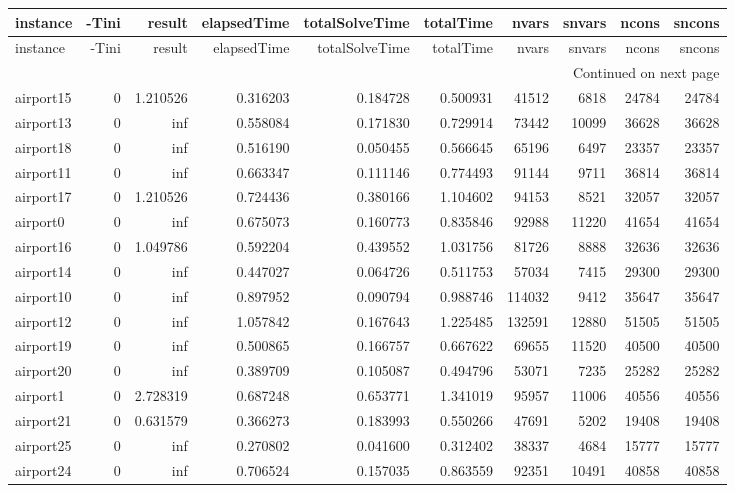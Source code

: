 
\begin{longtable}{|l|r|r|r|r|r|r|r|r|r|}
\toprule
instance & -Tini & result & elapsedTime & totalSolveTime & totalTime & nvars & snvars & ncons & sncons \\
\midrule
\endfirsthead
\toprule
instance & -Tini & result & elapsedTime & totalSolveTime & totalTime & nvars & snvars & ncons & sncons \\
\midrule
\endhead
\midrule
\multicolumn{10}{r}{Continued on next page} \\
\midrule
\endfoot
\bottomrule
\endlastfoot
airport15 & 0 & 1.210526 & 0.316203 & 0.184728 & 0.500931 & 41512 & 6818 & 24784 & 24784 \\
airport13 & 0 & inf & 0.558084 & 0.171830 & 0.729914 & 73442 & 10099 & 36628 & 36628 \\
airport18 & 0 & inf & 0.516190 & 0.050455 & 0.566645 & 65196 & 6497 & 23357 & 23357 \\
airport11 & 0 & inf & 0.663347 & 0.111146 & 0.774493 & 91144 & 9711 & 36814 & 36814 \\
airport17 & 0 & 1.210526 & 0.724436 & 0.380166 & 1.104602 & 94153 & 8521 & 32057 & 32057 \\
airport0 & 0 & inf & 0.675073 & 0.160773 & 0.835846 & 92988 & 11220 & 41654 & 41654 \\
airport16 & 0 & 1.049786 & 0.592204 & 0.439552 & 1.031756 & 81726 & 8888 & 32636 & 32636 \\
airport14 & 0 & inf & 0.447027 & 0.064726 & 0.511753 & 57034 & 7415 & 29300 & 29300 \\
airport10 & 0 & inf & 0.897952 & 0.090794 & 0.988746 & 114032 & 9412 & 35647 & 35647 \\
airport12 & 0 & inf & 1.057842 & 0.167643 & 1.225485 & 132591 & 12880 & 51505 & 51505 \\
airport19 & 0 & inf & 0.500865 & 0.166757 & 0.667622 & 69655 & 11520 & 40500 & 40500 \\
airport20 & 0 & inf & 0.389709 & 0.105087 & 0.494796 & 53071 & 7235 & 25282 & 25282 \\
airport1 & 0 & 2.728319 & 0.687248 & 0.653771 & 1.341019 & 95957 & 11006 & 40556 & 40556 \\
airport21 & 0 & 0.631579 & 0.366273 & 0.183993 & 0.550266 & 47691 & 5202 & 19408 & 19408 \\
airport25 & 0 & inf & 0.270802 & 0.041600 & 0.312402 & 38337 & 4684 & 15777 & 15777 \\
airport24 & 0 & inf & 0.706524 & 0.157035 & 0.863559 & 92351 & 10491 & 40858 & 40858 \\

\end{longtable}
